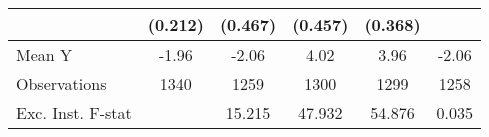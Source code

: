 {\begin{tabular}{l*{5}{c}}
            &     (0.212)         &     (0.467)         &     (0.457)         &     (0.368)         &                     \\
\midrule
Mean Y      &       -1.96         &       -2.06         &        4.02         &        3.96         &       -2.06         \\
Observations&        1340         &        1259         &        1300         &        1299         &        1258         \\
Exc. Inst. F-stat&                     &      15.215         &      47.932         &      54.876         &       0.035         \\
\bottomrule
\end{tabular}
}
